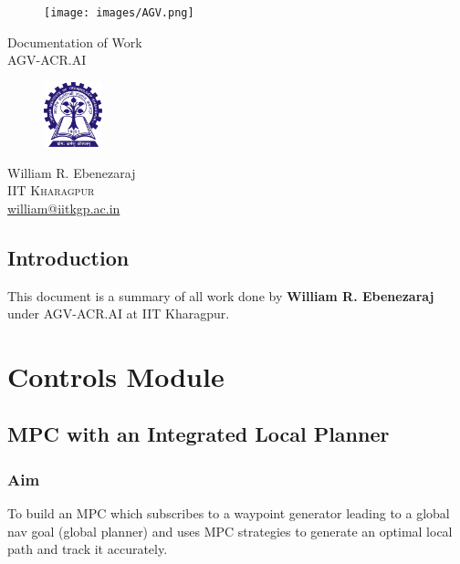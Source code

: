 \documentclass[a4paper,12pt]{report}
\begin{document}
\begin{titlepage}

\vspace*{0pt}
\begin{figure}[H]
	\centering
	\texttt{[image: images/AGV.png]}
\end{figure}
\vspace*{\fill}
\centering 
\Huge Documentation of Work
\vspace{12pt}\\
\small AGV-ACR.AI
\vspace*{\fill}\\
\begin{figure}[H]
	\centering
	\includegraphics[width=0.15\textwidth]{images/logo.png}
\end{figure}
\Large William R. Ebenezaraj
\vspace{2pt}\\
\small \textsc{IIT Kharagpur}\\
\href{mailto:william@iitkgp.ac.in}{william@iitkgp.ac.in}
\vspace*{0pt}
\end{titlepage}

\newpage

\tableofcontents



\newpage

\section{Introduction}
This document is a summary of all work done by \textbf{William R. Ebenezaraj} under AGV-ACR.AI at IIT Kharagpur.

\chapter{Controls Module}
\section{MPC with an Integrated Local Planner}
\subsection{Aim}
To build an MPC which subscribes to a waypoint generator leading to a global nav goal (global planner) and uses MPC strategies to generate an optimal local path and track it accurately.
\end{document}
